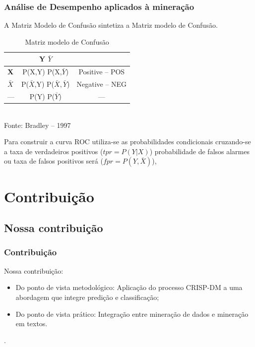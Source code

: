 \documentclass[11pt]{beamer}
\begin{document}
\begin{frame}\frametitle{ Análise de Desempenho aplicados à mineração}
	
	A Matriz Modelo de Confusão sintetiza a Matriz modelo de Confusão.
\begin{table}[ht]
	\centering
	\caption{Matriz modelo de Confusão}
	\vspace{1mm}
	\begin{tabular}{l|c|c}
		\hline
		\textbf{}           & \textbf{Y}     \textbf{$\bar{Y}$}   & \textbf{}\\
		\hline
		\textbf{X}          & P(X,Y)         P(X,$\bar{Y}$)       & Positive -- POS\\
		\textbf{$\bar{X}$}  & P($\bar{X}$,Y) P($\bar{X},\bar{Y}$) & Negative -- NEG\\
		\hline
		---              & P(Y)           P($\bar{Y}$)         &     ---        \\
	\end{tabular}
	\\
	\tiny Fonte: Bradley -- 1997
\end{table}

 Para construir a curva ROC utiliza-se as probabilidades condicionais cruzando-se a taxa de verdadeiros positivos ($ tpr = P(Y|X)$) probabilidade de falsos alarmes ou taxa de falsos positivos será ($ fpr = P(Y,\bar{X})$),
 
 
\end{frame}

\section{Contribuição}
\subsection{Nossa contribuição}
\begin{frame}
	\frametitle{Contribuição}
	 Nossa contribuição:
	 \begin{itemize}
	 	\item Do ponto de vista metodológico: Aplicação do processo CRISP-DM a uma abordagem que integre predição e classificação;
	 	\pause
	 	\item Do ponto de vista prático: Integração entre mineração de dados e mineração em textos.
	 \end{itemize}.
\end{frame}
\end{document}
